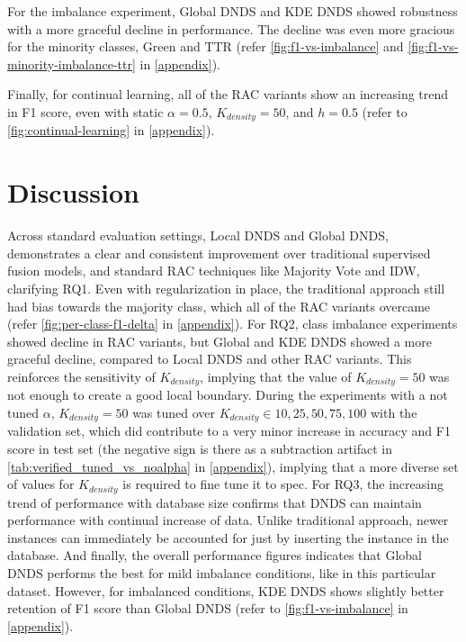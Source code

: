 \documentclass{article}
\begin{document}
For the imbalance experiment, Global DNDS and KDE DNDS showed robustness with a more graceful decline in performance. The decline was even more gracious for the minority classes, Green and TTR (refer \autoref{fig:f1-vs-imbalance} and \autoref{fig:f1-vs-minority-imbalance-ttr} in \autoref{appendix}). 

Finally, for continual learning, all of the RAC variants show an increasing trend in F1 score, even with static $\alpha = 0.5$, $K_{density} = 50$, and $h=0.5$ (refer to \autoref{fig:continual-learning} in \autoref{appendix}).

\section{Discussion}
\label{sec:discussion}

Across standard evaluation settings, Local DNDS and Global DNDS, demonstrates a clear and consistent improvement over traditional supervised fusion models, and standard RAC techniques like Majority Vote and IDW, clarifying RQ1. Even with regularization in place, the traditional approach still had bias towards the majority class, which all of the RAC variants overcame (refer \autoref{fig:per-class-f1-delta} in \autoref{appendix}). For RQ2, class imbalance experiments showed decline in RAC variants, but Global and KDE DNDS showed a more graceful decline, compared to Local DNDS and other RAC variants. This reinforces the sensitivity of $K_{density}$, implying that the value of $K_{density} = 50$ was not enough to create a good local boundary. During the experiments with a not tuned $\alpha$, $K_{density} = 50$ was tuned over $K_{density} \in {10, 25, 50, 75, 100}$ with the validation set, which did contribute to a very minor increase in accuracy and F1 score in test set (the negative sign is there as a subtraction artifact in \autoref{tab:verified_tuned_vs_noalpha} in \autoref{appendix}), implying that a more diverse set of values for $K_{density}$ is required to fine tune it to spec. For RQ3, the increasing trend of performance with database size confirms that DNDS can maintain performance with continual increase of data. Unlike traditional approach, newer instances can immediately be accounted for just by inserting the instance in the database. And finally, the overall performance figures indicates that Global DNDS performs the best for mild imbalance conditions, like in this particular dataset. However, for imbalanced conditions, KDE DNDS shows slightly better retention of F1 score than Global DNDS (refer to \autoref{fig:f1-vs-imbalance} in \autoref{appendix}).
\end{document}
